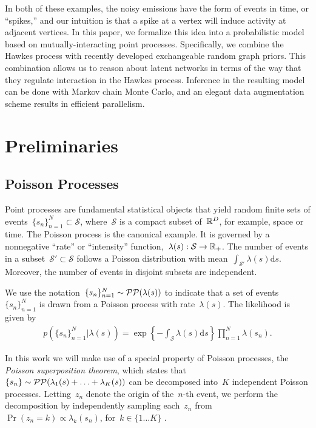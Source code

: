 In both of these examples, the noisy emissions have the form of events in time, or ``spikes,'' and our intuition is that a spike at a vertex will induce activity at adjacent vertices.  In this paper, we formalize this idea into a probabilistic model based on mutually-interacting point processes.  Specifically, we combine the Hawkes process \cite{Hawkes-1971} with recently developed exchangeable random graph priors.  This combination allows us to reason about latent networks in terms of the way that they regulate interaction in the Hawkes process.  Inference in the resulting model can be done with Markov chain Monte Carlo, and an elegant data augmentation scheme results in efficient parallelism. 


\section{Preliminaries}
\subsection{Poisson Processes}
Point processes are fundamental statistical objects that yield random finite sets of events~${\{s_n\}_{n=1}^N \subset \mathcal{S}}$, where~$\mathcal{S}$ is a compact subset of~${\mathbb{R}^D}$, for example, space or time. The Poisson process is the canonical example. It is governed by a nonnegative ``rate'' or  ``intensity'' function,~${\lambda(s): \mathcal{S}\rightarrow\mathbb{R}_+}$. The number of events in a subset~${\mathcal{S}'\subset\mathcal{S}}$ follows a Poisson distribution with mean~${\int_{\mathcal{S}'}\lambda(s)\mathrm{d}s}$. Moreover, the number of events in disjoint subsets are independent. 

We use the notation~${\{s_n\}_{n=1}^N\sim\mathcal{PP}(\lambda(s))}$ to indicate that a set of events~$\{s_n\}_{n=1}^N$ is drawn from a Poisson process with rate~$\lambda(s)$. The likelihood is given by
\begin{align}
\label{eq:poisson_lkhd}
p(\{s_n\}_{n=1}^N|\lambda(s))=\exp\left\{-\!\int_{\mathcal{S}}\!\lambda(s)\mathrm{d}s\right\}\prod_{n=1}^N\lambda(s_n).
\end{align}

In this work we will make use of a special property of Poisson processes, the \emph{Poisson superposition theorem}, which states that ~${\{s_n\}\sim\mathcal{PP}(\lambda_1(s)+\ldots+\lambda_K(s))}$ can be decomposed into~$K$ independent Poisson processes. Letting~${z_n}$ denote the origin of the~$n$-th event, we perform the decomposition by independently sampling each~${z_n}$ from~${\Pr(z_n=k)\propto\lambda_k(s_n)}$, for~${k\in\{1\ldots K\}}$ \cite{Daley-1988}. 

